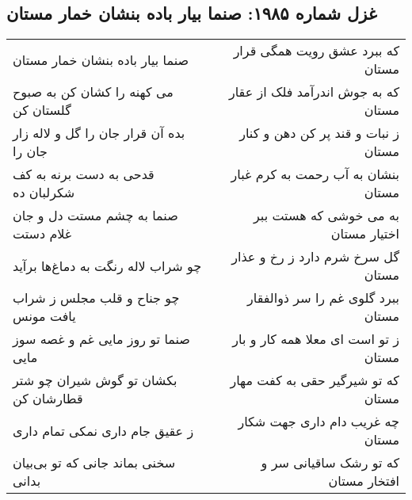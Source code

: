 \begin{center}
\section*{غزل شماره ۱۹۸۵: صنما بیار باده بنشان خمار مستان}
\label{sec:1985}
\begin{longtable}{l p{0.5cm} r}
صنما بیار باده بنشان خمار مستان
&&
که ببرد عشق رویت همگی قرار مستان
\\
می کهنه را کشان کن به صبوح گلستان کن
&&
که به جوش اندرآمد فلک از عقار مستان
\\
بده آن قرار جان را گل و لاله زار جان را
&&
ز نبات و قند پر کن دهن و کنار مستان
\\
قدحی به دست برنه به کف شکرلبان ده
&&
بنشان به آب رحمت به کرم غبار مستان
\\
صنما به چشم مستت دل و جان غلام دستت
&&
به می خوشی که هستت ببر اختیار مستان
\\
چو شراب لاله رنگت به دماغ‌ها برآید
&&
گل سرخ شرم دارد ز رخ و عذار مستان
\\
چو جناح و قلب مجلس ز شراب یافت مونس
&&
ببرد گلوی غم را سر ذوالفقار مستان
\\
صنما تو روز مایی غم و غصه سوز مایی
&&
ز تو است ای معلا همه کار و بار مستان
\\
بکشان تو گوش شیران چو شتر قطارشان کن
&&
که تو شیرگیر حقی به کفت مهار مستان
\\
ز عقیق جام داری نمکی تمام داری
&&
چه غریب دام داری جهت شکار مستان
\\
سخنی بماند جانی که تو بی‌بیان بدانی
&&
که تو رشک ساقیانی سر و افتخار مستان
\\
\end{longtable}
\end{center}
